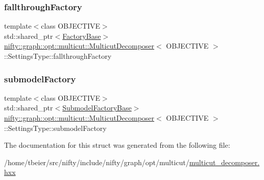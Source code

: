 \subsubsection{\texorpdfstring{fallthrough\+Factory}{fallthroughFactory}}
{\footnotesize\ttfamily template$<$class O\+B\+J\+E\+C\+T\+I\+VE$>$ \\
std\+::shared\+\_\+ptr$<$\hyperlink{classnifty_1_1graph_1_1opt_1_1multicut_1_1MulticutDecomposer_a0fb13bd2e6a0c561ae55b31deab53639}{Factory\+Base}$>$ \hyperlink{classnifty_1_1graph_1_1opt_1_1multicut_1_1MulticutDecomposer}{nifty\+::graph\+::opt\+::multicut\+::\+Multicut\+Decomposer}$<$ O\+B\+J\+E\+C\+T\+I\+VE $>$\+::Settings\+Type\+::fallthrough\+Factory}

\mbox{\label{structnifty_1_1graph_1_1opt_1_1multicut_1_1MulticutDecomposer_1_1SettingsType_a28b5c87651310fa67d1fb6b2f1b92649}} 
\subsubsection{\texorpdfstring{submodel\+Factory}{submodelFactory}}
{\footnotesize\ttfamily template$<$class O\+B\+J\+E\+C\+T\+I\+VE$>$ \\
std\+::shared\+\_\+ptr$<$\hyperlink{classnifty_1_1graph_1_1opt_1_1multicut_1_1MulticutDecomposer_a7b25dc946b8d2e57e76ab54bca655f63}{Submodel\+Factory\+Base}$>$ \hyperlink{classnifty_1_1graph_1_1opt_1_1multicut_1_1MulticutDecomposer}{nifty\+::graph\+::opt\+::multicut\+::\+Multicut\+Decomposer}$<$ O\+B\+J\+E\+C\+T\+I\+VE $>$\+::Settings\+Type\+::submodel\+Factory}



The documentation for this struct was generated from the following file\+:\begin{DoxyCompactItemize}
\item 
/home/tbeier/src/nifty/include/nifty/graph/opt/multicut/\hyperlink{multicut__decomposer_8hxx}{multicut\+\_\+decomposer.\+hxx}\end{DoxyCompactItemize}
